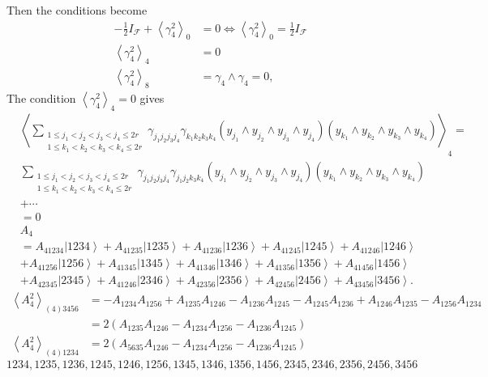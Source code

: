 \documentclass[aps,preprint]{revtex4}%
\begin{document}
Then the conditions become
\begin{align}
-\frac{1}{2}I_{\mathcal{F}}+\left\langle \gamma_{4}^{2}\right\rangle _{0}  &
=0\Leftrightarrow\left\langle \gamma_{4}^{2}\right\rangle _{0}=\frac{1}%
{2}I_{\mathcal{F}}\\
\left\langle \gamma_{4}^{2}\right\rangle _{4}  &  =0\\
\left\langle \gamma_{4}^{2}\right\rangle _{8}  &  =\gamma_{4}\wedge\gamma
_{4}=0,
\end{align}
The condition $\left\langle \gamma_{4}^{2}\right\rangle _{4}=0$ gives
\begin{align}
&  \left\langle \sum_{\substack{1\leq j_{1}<j_{2}<j_{3}<j_{4}\leq2r\\1\leq
k_{1}<k_{2}<k_{3}<k_{4}\leq2r}}\gamma_{j_{1}j_{2}j_{3}j_{4}}\gamma_{k_{1}%
k_{2}k_{3}k_{4}}\left(  y_{j_{1}}\wedge y_{j_{2}}\wedge y_{j_{3}}\wedge
y_{j_{4}}\right)  \left(  y_{k_{1}}\wedge y_{k_{2}}\wedge y_{k_{3}}\wedge
y_{k_{4}}\right)  \right\rangle _{4}=\\
&  \sum_{\substack{1\leq j_{1}<j_{2}<j_{3}<j_{4}\leq2r\\1\leq k_{1}%
<k_{2}<k_{3}<k_{4}\leq2r}}\gamma_{j_{1}j_{2}j_{3}j_{4}}\gamma_{j_{1}j_{2}%
k_{3}k_{4}}\left(  y_{j_{1}}\wedge y_{j_{2}}\wedge y_{j_{3}}\wedge y_{j_{4}%
}\right)  \left(  y_{k_{1}}\wedge y_{k_{2}}\wedge y_{k_{3}}\wedge y_{k_{4}%
}\right) \\
&  +\cdots\\
&  =0
\end{align}%
\begin{align}
&  A_{4}\\
&  =A_{41234}\left\vert 1234\right\rangle +A_{41235}\left\vert
1235\right\rangle +A_{41236}\left\vert 1236\right\rangle +A_{41245}\left\vert
1245\right\rangle +A_{41246}\left\vert 1246\right\rangle \\
&  +A_{41256}\left\vert 1256\right\rangle +A_{41345}\left\vert
1345\right\rangle +A_{41346}\left\vert 1346\right\rangle +A_{41356}\left\vert
1356\right\rangle +A_{41456}\left\vert 1456\right\rangle \\
&  +A_{42345}\left\vert 2345\right\rangle +A_{41246}\left\vert
2346\right\rangle +A_{42356}\left\vert 2356\right\rangle +A_{42456}\left\vert
2456\right\rangle +A_{43456}\left\vert 3456\right\rangle .
\end{align}%
\begin{align}
\left\langle A_{4}^{2}\right\rangle _{\left(  4\right)  3456}  &
=-A_{1234}A_{1256}+A_{1235}A_{1246}-A_{1236}A_{1245}-A_{1245}A_{1236}%
+A_{1246}A_{1235}-A_{1256}A_{1234}\\
&  =2\left(  A_{1235}A_{1246}-A_{1234}A_{1256}-A_{1236}A_{1245}\right) \\
\left\langle A_{4}^{2}\right\rangle _{\left(  4\right)  1234}  &  =2\left(
A_{5635}A_{1246}-A_{1234}A_{1256}-A_{1236}A_{1245}\right)
\end{align}%
\begin{equation}
1234,1235,1236,1245,1246,1256,1345,1346,1356,1456,2345,2346,2356,2456,3456
\end{equation}
\end{document}
